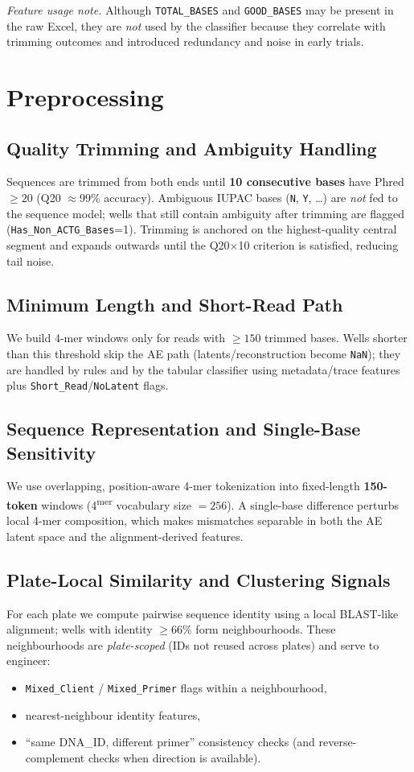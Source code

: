 \noindent\textit{Feature usage note.} Although \texttt{TOTAL\_BASES} and \texttt{GOOD\_BASES} may be present in the raw Excel, they are \emph{not} used by the classifier because they correlate with trimming outcomes and introduced redundancy and noise in early trials.

\section{Preprocessing}
\label{sec:preproc}

\subsection{Quality Trimming and Ambiguity Handling}
Sequences are trimmed from both ends until \textbf{10 consecutive bases} have Phred $\geq 20$ (Q20 $\approx$99\% accuracy). Ambiguous IUPAC bases (\texttt{N}, \texttt{Y}, \ldots) are \emph{not} fed to the sequence model; wells that still contain ambiguity after trimming are flagged (\texttt{Has\_Non\_ACTG\_Bases}=1). Trimming is anchored on the highest-quality central segment and expands outwards until the Q20$\times$10 criterion is satisfied, reducing tail noise.

\subsection{Minimum Length and Short-Read Path}
We build 4-mer windows only for reads with $\geq 150$ trimmed bases. Wells shorter than this threshold skip the AE path (latents/reconstruction become \texttt{NaN}); they are handled by rules and by the tabular classifier using metadata/trace features plus \texttt{Short\_Read}/\texttt{NoLatent} flags.

\subsection{Sequence Representation and Single-Base Sensitivity}
We use overlapping, position-aware 4-mer tokenization into fixed-length \textbf{150-token} windows (4\textsuperscript{mer} vocabulary size $=256$). A single-base difference perturbs local 4-mer composition, which makes mismatches separable in both the AE latent space and the alignment-derived features.

\subsection{Plate-Local Similarity and Clustering Signals}
For each plate we compute pairwise sequence identity using a local BLAST-like alignment; wells with identity $\geq 66\%$ form neighbourhoods. These neighbourhoods are \emph{plate-scoped} (IDs not reused across plates) and serve to engineer:
\begin{itemize}
  \item \texttt{Mixed\_Client} / \texttt{Mixed\_Primer} flags within a neighbourhood,
  \item nearest-neighbour identity features,
  \item ``same DNA\_ID, different primer'' consistency checks (and reverse-complement checks when direction is available).
\end{itemize}

